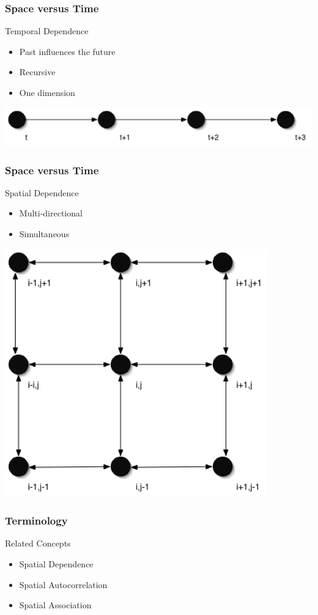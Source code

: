 \documentclass[nototal]{beamer}
\begin{document}
\begin{frame}
    \frametitle{Space versus Time}
    \begin{block}{Temporal Dependence}
    \begin{itemize}
      \item Past influences the future
      \item Recursive
      \item One dimension
    \end{itemize}
  \end{block}
\begin{center}
      \includegraphics[width=.65\linewidth]{timerecursive.png}
    \end{center}

  \end{frame}

\begin{frame}
    \frametitle{Space versus Time}
    \begin{block}{Spatial Dependence}
    \begin{itemize}
      \item Multi-directional
      \item Simultaneous
    \end{itemize}
  \end{block}
\begin{center}
      \includegraphics[width=.55\linewidth]{spacesimultaneous.png}
    \end{center}


  \end{frame}


\begin{frame}
    \frametitle{Terminology}
    \begin{block}{Related Concepts}
    \begin{itemize}
      \item Spatial Dependence
      \item Spatial Autocorrelation
      \item Spatial Association
    \end{itemize}
  \end{block}
  \end{frame}
\end{document}
